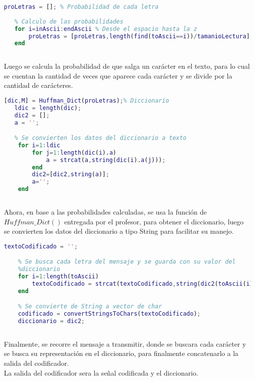 \begin{lstlisting}[language=Matlab,breaklines = true,frame      = false]
   proLetras = []; % Probabilidad de cada letra
   
   % Calculo de las probabilidades
   for i=inAscii:endAscii % Desde el espacio hasta la z
       proLetras = [proLetras,length(find(toAscii==i))/tamanioLectura]; % Se aniade su probabilidad
   end
   
\end{lstlisting}

Luego se calcula la probabilidad de que salga un carácter en el texto, para lo cual se cuentan la cantidad de veces que aparece cada carácter y se divide por la cantidad de carácteres.

\begin{lstlisting}[language=Matlab,breaklines = true,frame      = false]
   [dic,M] = Huffman_Dict(proLetras);% Diccionario
   ldic = length(dic);
   dic2 = [];
   a = '';

   % Se convierten los datos del diccionario a texto
    for i=1:ldic    
        for j=1:length(dic(i).a)        
            a = strcat(a,string(dic(i).a(j)));
        end
        dic2=[dic2,string(a)];
        a='';
    end
   
\end{lstlisting}

Ahora, en base a las probabilidades calculadas, se usa la función de $Huffman\_Dict()$ entregada por el profesor, para obtener el diccionario, luego se convierten los datos del diccionario a tipo String para facilitar su manejo.

\begin{lstlisting}[language=Matlab,breaklines = true,frame      = false]
    textoCodificado = '';

    % Se busca cada letra del mensaje y se guarda con su valor del
    %diccionario
    for i=1:length(toAscii)
        textoCodificado = strcat(textoCodificado,string(dic2(toAscii(i)-(inAscii-1))));
    end

    % Se convierte de String a vector de char
    codificado = convertStringsToChars(textoCodificado);
    diccionario = dic2;
   
\end{lstlisting}

Finalmente, se recorre el mensaje a transmitir, donde se buscara cada carácter y se busca su representación en el diccionario, para finalmente concatenarlo a la salida del codificador.\\
La salida del codificador sera la señal codificada y el diccionario.

